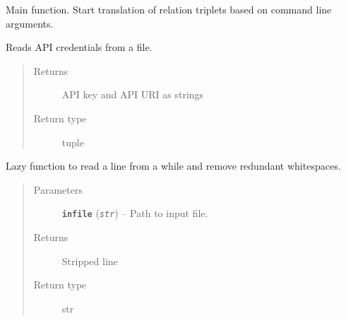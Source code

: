 \documentclass[letterpaper,10pt,english]{sphinxmanual}
\begin{document}

\begin{fulllineitems}
\label{src.prep.relations:src.prep.relations.relations.main}
Main function. Start translation of relation triplets based on command line arguments.

\end{fulllineitems}


\begin{fulllineitems}
\label{src.prep.relations:src.prep.relations.relations.read_credentials}
Reads API credentials from a file.
\begin{quote}\begin{description}
\item[{Returns}] \leavevmode
API key and API URI as strings

\item[{Return type}] \leavevmode
tuple

\end{description}\end{quote}

\end{fulllineitems}


\begin{fulllineitems}
\label{src.prep.relations:src.prep.relations.relations.rl}
Lazy function to read a line from a while and remove redundant whitespaces.
\begin{quote}\begin{description}
\item[{Parameters}] \leavevmode
\textbf{\texttt{infile}} (\emph{\texttt{str}}) -- Path to input file.

\item[{Returns}] \leavevmode
Stripped line

\item[{Return type}] \leavevmode
str

\end{description}\end{quote}

\end{fulllineitems}
\end{document}
